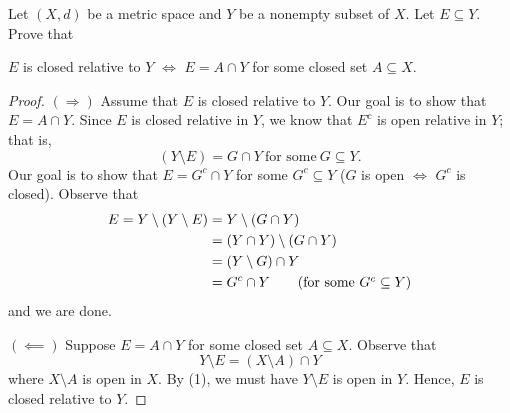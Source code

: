 \documentclass[a4paper]{article}
\begin{document}
   \begin{problem}
      Let \( (X,d) \) be a metric space and \( Y  \) be a nonempty subset of \( X  \). Let \( E \subseteq Y \). Prove that   
      \begin{center}
          \( E  \) is closed relative to \( Y  \) \( \iff \) \( E = A \cap Y  \) for some closed set \( A \subseteq  X \).
      \end{center}
   \end{problem} 
   \begin{proof}
    \( (\Longrightarrow) \) Assume that \( E  \) is closed relative to \( Y  \). Our goal is to show that \( E = A \cap Y  \). Since \( E  \) is closed relative in \( Y \), we know that \( E^{c} \) is open relative in \( Y  \); that is, 
    \[ (Y \setminus  E ) = G \cap Y \ \text{for some} \  G \subseteq Y. \]
    Our goal is to show that \( E = G^{c} \cap Y  \) for some \( G^{c} \subseteq Y \) (\( G \) is open \( \iff \) \( G^{c} \) is closed). Observe that 
    \begin{align*}
        E = Y \setminus  (Y \setminus  E ) &= Y \setminus  ( G \cap Y) \\
                                           &= (Y \cap Y) \setminus  (G \cap Y) \\
                                           &=  (Y \setminus  G) \cap Y \\
                                           &=  G^{c} \cap Y \tag{for some \( G^{c} \subseteq Y \)}
    \end{align*}
    and we are done.
    
    
        
    \( (\impliedby) \) Suppose \( E = A \cap Y  \) for some closed set \( A \subseteq X  \). Observe that  
    \[  Y \setminus  E = (X \setminus  A ) \cap Y  \tag{1} \]
    where \( X \setminus  A  \) is open in \( X  \). By (1), we must have \( Y \setminus  E  \) is open in \( Y  \). Hence, \( E  \) is closed relative to \( Y  \). 
\end{proof}
   
\end{document}
